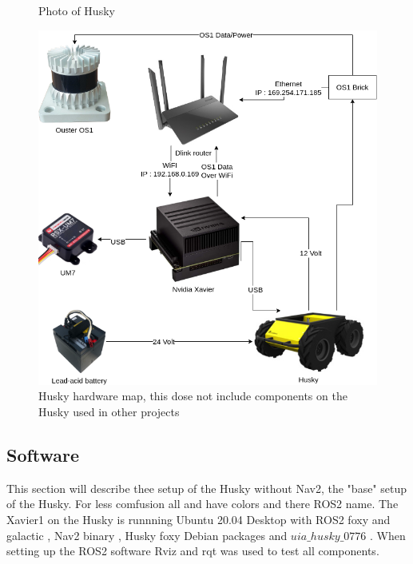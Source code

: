 \begin{figure}[H]
\begin{minipage}[b]{0.4\textwidth}
    \caption{Photo of Husky}
    \label{fig:husky_irl}
  \end{minipage}
  \hfill
  \begin{minipage}[b]{0.59\textwidth}
    \includegraphics[width=\textwidth]{Figures/drawio/Husky_HW.drawio.png}
    \caption{Husky hardware map, this dose not include components on the Husky used in other projects}
    \label{fig:Husky_HW}
  \end{minipage}
\end{figure}
\subsection{Software}
This section will describe thee setup of the Husky without Nav2, the 
"base" setup of the Husky. For less comfusion all  and  have colors and there ROS2 name. 
The Xavier1 on the Husky is runnning Ubuntu 20.04 Desktop
\cite{ubuntu20_04} with ROS2 foxy \cite{rosfoxyinstall} and galactic \cite{rosgalacticinstall}, Nav2 binary \cite{rosnavinstall}, Husky foxy Debian packages \cite{huskyinstall} and $uia\_husky\_0776$ \cite{uiahusky}. When setting up the ROS2 software Rviz and rqt was used to test all components. \newline
    
